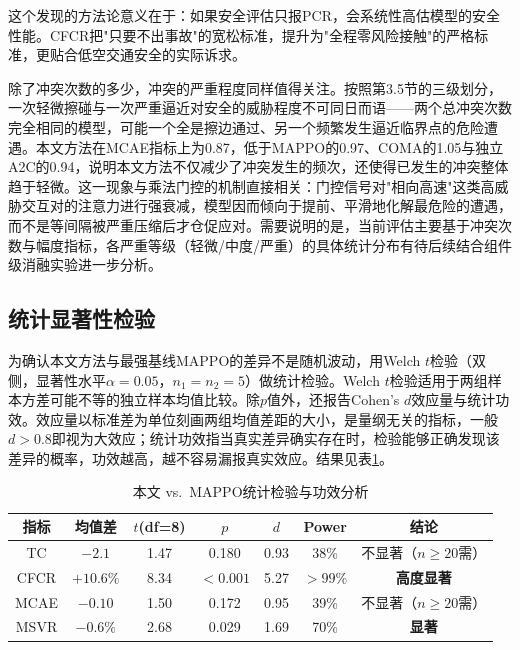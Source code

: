 \documentclass[12pt,a4paper,UTF8]{ctexart}
\begin{document}
这个发现的方法论意义在于：如果安全评估只报PCR，会系统性高估模型的安全性能。CFCR把"只要不出事故"的宽松标准，提升为"全程零风险接触"的严格标准，更贴合低空交通安全的实际诉求。

除了冲突次数的多少，冲突的严重程度同样值得关注。按照第3.5节的三级划分，一次轻微擦碰与一次严重逼近对安全的威胁程度不可同日而语——两个总冲突次数完全相同的模型，可能一个全是擦边通过、另一个频繁发生逼近临界点的危险遭遇。本文方法在MCAE指标上为0.87，低于MAPPO的0.97、COMA的1.05与独立A2C的0.94，说明本文方法不仅减少了冲突发生的频次，还使得已发生的冲突整体趋于轻微。这一现象与乘法门控的机制直接相关：门控信号对"相向高速"这类高威胁交互对的注意力进行强衰减，模型因而倾向于提前、平滑地化解最危险的遭遇，而不是等间隔被严重压缩后才仓促应对。需要说明的是，当前评估主要基于冲突次数与幅度指标，各严重等级（轻微/中度/严重）的具体统计分布有待后续结合组件级消融实验进一步分析。

\subsection{统计显著性检验}

为确认本文方法与最强基线MAPPO的差异不是随机波动，用Welch $t$检验\cite{ref42}（双侧，显著性水平$\alpha=0.05$，$n_1=n_2=5$）做统计检验。Welch $t$检验适用于两组样本方差可能不等的独立样本均值比较。除$p$值外，还报告Cohen's $d$效应量\cite{ref43}与统计功效。效应量以标准差为单位刻画两组均值差距的大小，是量纲无关的指标，一般$d>0.8$即视为大效应；统计功效指当真实差异确实存在时，检验能够正确发现该差异的概率，功效越高，越不容易漏报真实效应。结果见表\ref{tab:ttest}。

\begin{table}[H]
    \centering
    \caption{本文 vs.\ MAPPO统计检验与功效分析}
    \label{tab:ttest}
    \begin{tabular}{|c|c|c|c|c|c|c|}
        \hline
        \textbf{指标} & \textbf{均值差} & \textbf{$t$(df=8)} & \textbf{$p$} & \textbf{$d$} & \textbf{Power} & \textbf{结论} \\
        \hline
        TC & $-2.1$ & 1.47 & 0.180 & 0.93 & 38\% & 不显著（$n\geq20$需） \\
        CFCR & $+10.6\%$ & 8.34 & $<0.001$ & 5.27 & $>99\%$ & \textbf{高度显著} \\
        MCAE & $-0.10$ & 1.50 & 0.172 & 0.95 & 39\% & 不显著（$n\geq20$需） \\
        MSVR & $-0.6\%$ & 2.68 & 0.029 & 1.69 & 70\% & \textbf{显著} \\
        \hline
    \end{tabular}
\end{table}
\end{document}

